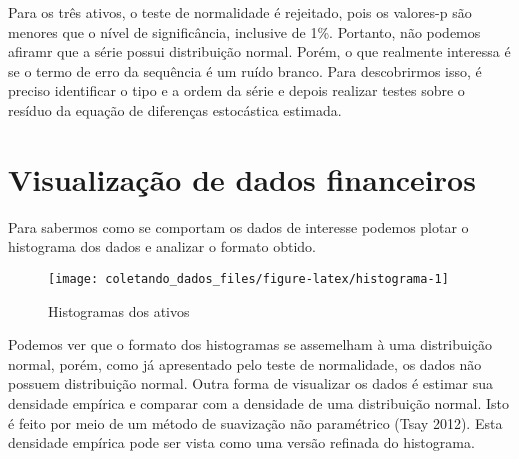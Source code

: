\documentclass[]{article}
\newenvironment{Shaded}{\begin{snugshade}}{\end{snugshade}}
\newcommand{\KeywordTok}[1]{\textcolor[rgb]{0.13,0.29,0.53}{\textbf{{#1}}}}
\newcommand{\DataTypeTok}[1]{\textcolor[rgb]{0.13,0.29,0.53}{{#1}}}
\newcommand{\DecValTok}[1]{\textcolor[rgb]{0.00,0.00,0.81}{{#1}}}
\newcommand{\StringTok}[1]{\textcolor[rgb]{0.31,0.60,0.02}{{#1}}}
\newcommand{\NormalTok}[1]{{#1}}
\begin{document}
Para os três ativos, o teste de normalidade é rejeitado, pois os
valores-p são menores que o nível de significância, inclusive de 1\%.
Portanto, não podemos afiramr que a série possui distribuição normal.
Porém, o que realmente interessa é se o termo de erro da sequência é um
ruído branco. Para descobrirmos isso, é preciso identificar o tipo e a
ordem da série e depois realizar testes sobre o resíduo da equação de
diferenças estocástica estimada.

\section{Visualização de dados
financeiros}\label{visualizacao-de-dados-financeiros}

Para sabermos como se comportam os dados de interesse podemos plotar o
histograma dos dados e analizar o formato obtido.

\begin{Shaded}
\end{Shaded}

\begin{figure}[h]

{\centering \texttt{[image: coletando\_dados\_files/figure-latex/histograma-1]} 

}

\caption{Histogramas dos ativos}\label{fig:histograma}
\end{figure}

Podemos ver que o formato dos histogramas se assemelham à uma
distribuição normal, porém, como já apresentado pelo teste de
normalidade, os dados não possuem distribuição normal. Outra forma de
visualizar os dados é estimar sua densidade empírica e comparar com a
densidade de uma distribuição normal. Isto é feito por meio de um método
de suavização não paramétrico (Tsay 2012). Esta densidade empírica pode
ser vista como uma versão refinada do histograma.
\end{document}
